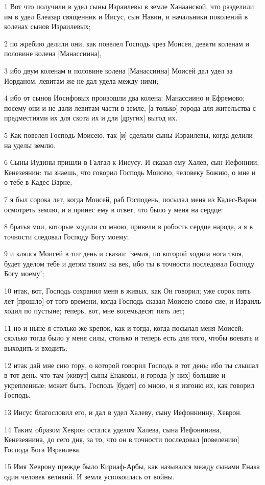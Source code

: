 \par 1 Вот что получили в удел сыны Израилевы в земле Ханаанской, что разделили им в удел Елеазар священник и Иисус, сын Навин, и начальники поколений в коленах сынов Израилевых;
\par 2 по жребию делили они, как повелел Господь чрез Моисея, девяти коленам и половине колена [Манассиина],
\par 3 ибо двум коленам и половине колена [Манассиина] Моисей дал удел за Иорданом, левитам же не дал удела между ними;
\par 4 ибо от сынов Иосифовых произошли два колена: Манассиино и Ефремово; посему они и не дали левитам части в земле, [а только] города для жительства с предместиями их для скота их и для [других] выгод их.
\par 5 Как повелел Господь Моисею, так [и] сделали сыны Израилевы, когда делили на уделы землю.
\par 6 Сыны Иудины пришли в Галгал к Иисусу. И сказал ему Халев, сын Иефоннии, Кенезеянин: ты знаешь, что говорил Господь Моисею, человеку Божию, о мне и о тебе в Кадес-Варне;
\par 7 я был сорока лет, когда Моисей, раб Господень, посылал меня из Кадес-Варни осмотреть землю, и я принес ему в ответ, что было у меня на сердце:
\par 8 братья мои, которые ходили со мною, привели в робость сердце народа, а я в точности следовал Господу Богу моему;
\par 9 и клялся Моисей в тот день и сказал: `земля, по которой ходила нога твоя, будет уделом тебе и детям твоим на век, ибо ты в точности последовал Господу Богу моему';
\par 10 итак, вот, Господь сохранил меня в живых, как Он говорил; уже сорок пять лет [прошло] от того времени, когда Господь сказал Моисею слово сие, и Израиль ходил по пустыне; теперь, вот, мне восемьдесят пять лет;
\par 11 но и ныне я столько же крепок, как и тогда, когда посылал меня Моисей: сколько тогда было у меня силы, столько и теперь есть для того, чтобы воевать и выходить и входить;
\par 12 итак дай мне сию гору, о которой говорил Господь в тот день; ибо ты слышал в тот день, что там [живут] сыны Енаковы, и города [у них] большие и укрепленные; может быть, Господь [будет] со мною, и я изгоню их, как говорил Господь.
\par 13 Иисус благословил его, и дал в удел Халеву, сыну Иефонниину, Хеврон.
\par 14 Таким образом Хеврон остался уделом Халева, сына Иефонниина, Кенезеянина, до сего дня, за то, что он в точности последовал [повелению] Господа Бога Израилева.
\par 15 Имя Хеврону прежде было Кириаф-Арбы, как назывался между сынами Енака один человек великий. И земля успокоилась от войны.

